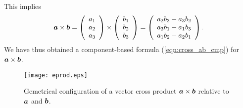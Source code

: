 \documentclass[10pt,a4j]{article}
\begin{document}
This implies 
\begin{equation}
    \mbox{\boldmath $a$}\times \mbox{\boldmath $b$}
    =
    \left(
        \begin{array}{c}
            a_1 \\
            a_2 \\ 
            a_3 
        \end{array}
    \right)
    \times
    \left(
        \begin{array}{c}
            b_1 \\
            b_2 \\ 
            b_3 
        \end{array}
    \right)
    =
    \left(
        \begin{array}{c}
            a_2b_3-a_3b_2 \\

            a_3b_1-a_1b_3 \\ 
            a_1b_2-a_2b_1
        \end{array}
    \right)
    \label{eqn:cross_ab_cmp}.
\end{equation}
We have thus obtained a component-based formula (\ref{eqn:cross_ab_cmp}) for $\mbox{\boldmath $a$}\times\mbox{\boldmath $b$}$.
\begin{figure}[h]
    \begin{center}
    \texttt{[image: eprod.eps]} 
    \end{center}
    \caption{Gemetrical configuration of a vector cross product 
    $\mbox{\boldmath $a$}\times\mbox{\boldmath $b$}$ relative to $\mbox{\boldmath $a$}$ and $\mbox{\boldmath $b$}$.} 
    \label{fig:fig9}
\end{figure}
\end{document}
